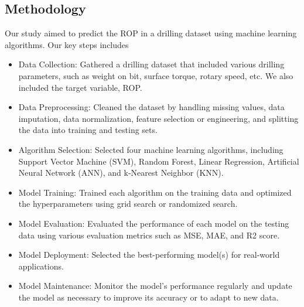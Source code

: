     \begin{center}
      \vspace{.1cm}
      \section*{Methodology}
      \end{center}
      \vspace{-.05cm}
      Our study aimed to predict the ROP in a drilling dataset using machine learning algorithms. Our key steps includes 
    
    \begin{itemize}
    \item Data Collection: Gathered a drilling dataset that included various drilling parameters, such as weight on bit, surface torque, rotary speed, etc. We also included the target variable, ROP.
      	\item Data Preprocessing: Cleaned the dataset by handling missing values, data imputation, data normalization, feature selection or engineering, and splitting the data into training and testing sets.

\item Algorithm Selection: Selected four machine learning algorithms, including Support Vector Machine (SVM), Random Forest, Linear Regression, Artificial Neural Network (ANN), and k-Nearest Neighbor (KNN).

\item Model Training: Trained each algorithm on the training data and optimized the hyperparameters using grid search or randomized search.

\item Model Evaluation: Evaluated the performance of each model on the testing data using various evaluation metrics such as MSE, MAE, and R2 score.

\item Model Deployment: Selected the best-performing model(s) for real-world applications.

\item Model Maintenance: Monitor the model's performance regularly and update the model as necessary to improve its accuracy or to adapt to new data.

      \end{itemize}
